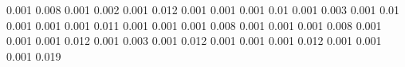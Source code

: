 0.001      0.008      %
0.001      0.002      %
0.001      0.012      %
0.001      0.001      %
0.001      0.01       %
0.001      0.003      %
0.001      0.01       %
0.001      0.001      %
0.001      0.011      %
0.001      0.001      %
0.001      0.008      %
0.001      0.001      %
0.001      0.008      %
0.001      0.001      %
0.001      0.012      %
0.001      0.003      %
0.001      0.012      %
0.001      0.001      %
0.001      0.012      %
0.001      0.001      %
0.001      0.019      %
